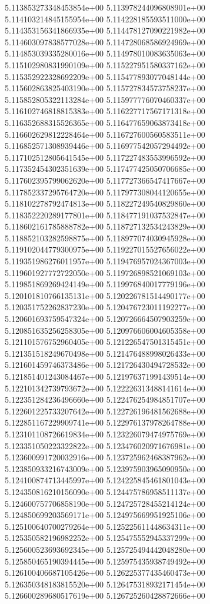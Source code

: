5.113853273348453854e+00
5.113978244096808901e+00
5.114103214845155954e+00
5.114228185593511000e+00
5.114353156341866935e+00
5.114478127090221982e+00
5.114603097838577028e+00
5.114728068586924969e+00
5.114853039335280016e+00
5.114978010083635063e+00
5.115102980831990109e+00
5.115227951580337162e+00
5.115352922328692209e+00
5.115477893077048144e+00
5.115602863825403190e+00
5.115727834573758237e+00
5.115852805322113284e+00
5.115977776070460337e+00
5.116102746818815383e+00
5.116227717567171318e+00
5.116352688315526365e+00
5.116477659063873418e+00
5.116602629812228464e+00
5.116727600560583511e+00
5.116852571308939446e+00
5.116977542057294492e+00
5.117102512805641545e+00
5.117227483553996592e+00
5.117352454302351639e+00
5.117477425050706685e+00
5.117602395799062620e+00
5.117727366547417667e+00
5.117852337295764720e+00
5.117977308044120655e+00
5.118102278792474813e+00
5.118227249540829860e+00
5.118352220289177801e+00
5.118477191037532847e+00
5.118602161785888782e+00
5.118727132534243829e+00
5.118852103282598875e+00
5.118977074030945928e+00
5.119102044779300975e+00
5.119227015527656022e+00
5.119351986276011957e+00
5.119476957024367003e+00
5.119601927772722050e+00
5.119726898521069103e+00
5.119851869269424149e+00
5.119976840017779196e+00
5.120101810766135131e+00
5.120226781514490177e+00
5.120351752262837230e+00
5.120476723011192277e+00
5.120601693759547324e+00
5.120726664507903259e+00
5.120851635256258305e+00
5.120976606004605358e+00
5.121101576752960405e+00
5.121226547501315451e+00
5.121351518249670498e+00
5.121476488998026433e+00
5.121601459746373486e+00
5.121726430494728532e+00
5.121851401243084467e+00
5.121976371991439514e+00
5.122101342739793672e+00
5.122226313488141614e+00
5.122351284236496660e+00
5.122476254984851707e+00
5.122601225733207642e+00
5.122726196481562688e+00
5.122851167229909741e+00
5.122976137978264788e+00
5.123101108726619834e+00
5.123226079474975769e+00
5.123351050223322822e+00
5.123476020971676981e+00
5.123600991720032916e+00
5.123725962468387962e+00
5.123850933216743009e+00
5.123975903965090950e+00
5.124100874713445997e+00
5.124225845461801043e+00
5.124350816210156090e+00
5.124475786958511137e+00
5.124600757706858190e+00
5.124725728455214124e+00
5.124850699203569171e+00
5.124975669951925106e+00
5.125100640700279264e+00
5.125225611448634311e+00
5.125350582196982252e+00
5.125475552945337299e+00
5.125600523693692345e+00
5.125725494442048280e+00
5.125850465190394445e+00
5.125975435938749492e+00
5.126100406687105426e+00
5.126225377435460473e+00
5.126350348183815520e+00
5.126475318932171454e+00
5.126600289680517619e+00
5.126725260428872666e+00
